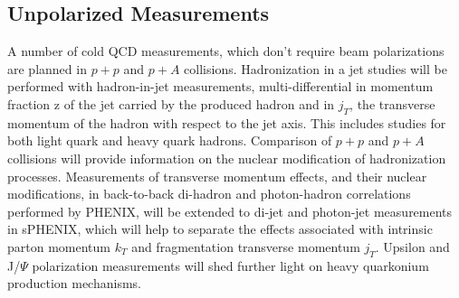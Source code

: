 \subsection {Unpolarized Measurements}

A number of cold QCD measurements, which don't require beam polarizations are planned in $p+p$ and $p+A$ collisions. Hadronization in a jet studies will be performed with hadron-in-jet measurements, multi-differential in momentum fraction z of the jet carried by the produced hadron and in $j_T$, the transverse momentum of the hadron with respect to the jet axis. This includes studies for both light quark and heavy quark hadrons. Comparison of $p+p$ and $p+A$ collisions will provide information on the nuclear modification of hadronization processes. Measurements of transverse momentum effects, and their nuclear modifications, in back-to-back di-hadron and photon-hadron correlations performed by PHENIX, will be extended to di-jet and photon-jet measurements in sPHENIX, which will help to separate the effects associated with intrinsic parton momentum $k_T$ and fragmentation transverse momentum $j_T$. Upsilon and J/$\Psi$ polarization measurements will shed further light on heavy quarkonium production mechanisms.

